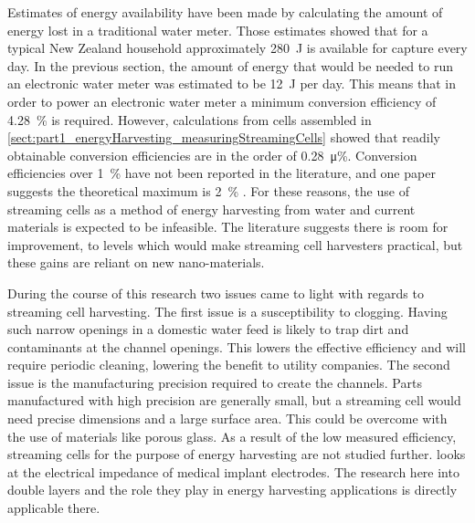 
Estimates of energy availability have been made by calculating the amount of energy lost in a traditional water meter.
Those estimates showed that for a typical New Zealand household approximately \SI{280}{\joule} is available for capture every day.
In the previous section, the amount of energy that would be needed to run an electronic water meter was estimated to be \SI{12}{\joule} per day.
This means that in order to power an electronic water meter a minimum conversion efficiency of \SI{4.28}{\percent} is required.
However, calculations from cells assembled in \cref{sect:part1_energyHarvesting_measuringStreamingCells} showed that readily obtainable conversion efficiencies are in the order of \SI{0.28}{\micro\percent}.
Conversion efficiencies over \SI{1}{\percent} have not been reported in the literature, and one paper suggests the theoretical maximum is \SI{2}{\percent} \cite{VanderHeyden2006}.
For these reasons, the use of streaming cells as a method of energy harvesting from water and current materials is expected to be infeasible.
The literature suggests there is room for improvement, to levels which would make streaming cell harvesters practical, but these gains are reliant on new nano-materials.

During the course of this research two issues came to light with regards to streaming cell harvesting.
The first issue is a susceptibility to clogging.
Having such narrow openings in a domestic water feed is likely to trap dirt and contaminants at the channel openings.
This lowers the effective efficiency and will require periodic cleaning, lowering the benefit to utility companies.
The second issue is the manufacturing precision required to create the channels.
Parts manufactured with high precision are generally small, but a streaming cell would need precise dimensions and a large surface area.
This could be overcome with the use of materials like porous glass.
As a result of the low measured efficiency, streaming cells for the purpose of energy harvesting are not studied further.
 looks at the electrical impedance of medical implant electrodes.
The research here into double layers and the role they play in energy harvesting applications is directly applicable there.

